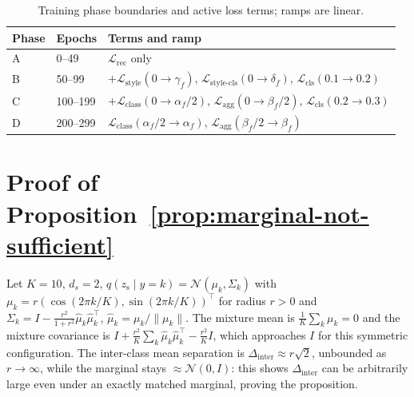 \documentclass[10pt,letterpaper]{article}
\newcommand{\zs}{z_{\mathrm{s}}}
\begin{document}
\begin{table}[h]
\centering
\small
\caption{Training phase boundaries and active loss terms; ramps are linear.}
\label{tab:phases}
\begin{tabular}{lll}
\toprule
Phase & Epochs & Terms and ramp \\
\midrule
A & 0--49   & $\mathcal{L}_{\mathrm{rec}}$ only \\
B & 50--99  & $+\mathcal{L}_{\mathrm{style}}(0{\to}\gamma_f)$,
              $\mathcal{L}_{\mathrm{style\text{-}cls}}(0{\to}\delta_f)$,
              $\mathcal{L}_{\mathrm{cls}}(0.1{\to}0.2)$ \\
C & 100--199 & $+\mathcal{L}_{\mathrm{class}}(0{\to}\alpha_f/2)$,
               $\mathcal{L}_{\mathrm{agg}}(0{\to}\beta_f/2)$,
               $\mathcal{L}_{\mathrm{cls}}(0.2{\to}0.3)$ \\
D & 200--299 & $\mathcal{L}_{\mathrm{class}}(\alpha_f/2{\to}\alpha_f)$,
               $\mathcal{L}_{\mathrm{agg}}(\beta_f/2{\to}\beta_f)$ \\
\bottomrule
\end{tabular}
\end{table}

\section{Proof of Proposition~\ref{prop:marginal-not-sufficient}}
\label{app:proof}

Let $K{=}10$, $d_s{=}2$, $q(\zs\mid y{=}k)=\mathcal{N}(\mu_k,\Sigma_k)$ with
$\mu_k=r(\cos(2\pi k/K),\sin(2\pi k/K))^\top$ for radius $r{>}0$ and
$\Sigma_k=I-\frac{r^2}{1+r^2}\hat\mu_k\hat\mu_k^\top$,
$\hat\mu_k=\mu_k/\|\mu_k\|$. The mixture mean is
$\frac{1}{K}\sum_k\mu_k=0$ and the mixture covariance is
$I+\frac{r^2}{K}\sum_k\hat\mu_k\hat\mu_k^\top-\frac{r^2}{K}I$, which
approaches $I$ for this symmetric configuration. The inter-class mean
separation is $\Delta_{\mathrm{inter}}\approx r\sqrt2$, unbounded as
$r\to\infty$, while the marginal stays $\approx\mathcal{N}(0,I)$: this
shows $\Delta_{\mathrm{inter}}$ can be arbitrarily large even under an
exactly matched marginal, proving the proposition.
\end{document}
